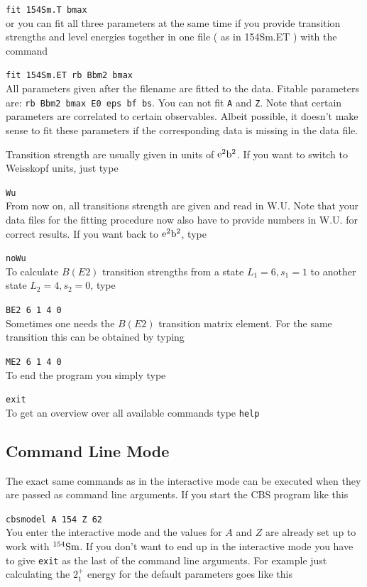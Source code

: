 \documentclass[10pt,a4paper]{article}
\begin{document}
\verb!fit 154Sm.T bmax! \\
or you can fit all three parameters at the same time if you provide transition strengths and level energies together in one file ( as in 154Sm.ET ) with the command 

\verb!fit 154Sm.ET rb Bbm2 bmax! \\
All parameters given after the filename are fitted to the data. Fitable parameters are: \verb!rb Bbm2 bmax E0 eps bf bs!. You can not fit \verb!A! and \verb!Z!. Note that certain parameters are correlated to certain observables. Albeit possible, it doesn't make sense to fit these parameters if the corresponding data is missing in the data file.

Transition strength are usually given in units of ${\rm e}^2 {\rm b}^2$. If you want to switch to Weisskopf units, just type

\verb!Wu! \\
From now on, all transitions strength are given and read in W.U. Note that your data files for the fitting procedure now also have to provide numbers in W.U. for correct results. If you want back to ${\rm e}^2 {\rm b}^2$, type

\verb!noWu! \\
To calculate $B(E2)$ transition strengths from a state $L_1=6, s_1=1$ to another state $L_2=4, s_2=0$, type

\verb!BE2 6 1 4 0! \\
Sometimes one needs the $B(E2)$ transition matrix element. For the same transition this can be obtained by typing 

\verb!ME2 6 1 4 0! \\
To end the program you simply type 

\verb!exit! \\
To get an overview over all available commands type
\verb!help! \\

\subsection{Command Line Mode}
The exact same commands as in the interactive mode can be executed when they are passed as command line arguments. If you start the CBS program like this

\verb!cbsmodel A 154 Z 62! \\
You enter the interactive mode and the values for $A$ and $Z$ are already set up to work with $^{154}{\rm Sm}$. If you don't want to end up in the interactive mode you have to give \verb!exit! as the last of the command line arguments. For example just calculating the $2^{+}_1$ energy for the default parameters goes like this
\end{document}
